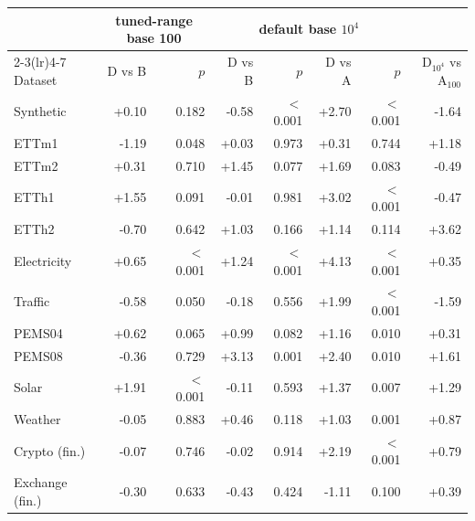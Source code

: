 \begin{tabular}{lrrrrrrr}
\toprule
 & \multicolumn{2}{c}{tuned-range base 100} & \multicolumn{4}{c}{default base $10^4$} & \\
\cmidrule(lr){2-3}\cmidrule(lr){4-7}
Dataset & D vs B & $p$ & D vs B & $p$ & D vs A & $p$ & D$_{10^4}$ vs A$_{100}$ \\
\midrule
Synthetic & +0.10 & 0.182 & -0.58 & $<$0.001 & +2.70 & $<$0.001 & -1.64 \\
ETTm1 & -1.19 & 0.048 & +0.03 & 0.973 & +0.31 & 0.744 & +1.18 \\
ETTm2 & +0.31 & 0.710 & +1.45 & 0.077 & +1.69 & 0.083 & -0.49 \\
ETTh1 & +1.55 & 0.091 & -0.01 & 0.981 & +3.02 & $<$0.001 & -0.47 \\
ETTh2 & -0.70 & 0.642 & +1.03 & 0.166 & +1.14 & 0.114 & +3.62 \\
Electricity & +0.65 & $<$0.001 & +1.24 & $<$0.001 & +4.13 & $<$0.001 & +0.35 \\
Traffic & -0.58 & 0.050 & -0.18 & 0.556 & +1.99 & $<$0.001 & -1.59 \\
PEMS04 & +0.62 & 0.065 & +0.99 & 0.082 & +1.16 & 0.010 & +0.31 \\
PEMS08 & -0.36 & 0.729 & +3.13 & 0.001 & +2.40 & 0.010 & +1.61 \\
Solar & +1.91 & $<$0.001 & -0.11 & 0.593 & +1.37 & 0.007 & +1.29 \\
Weather & -0.05 & 0.883 & +0.46 & 0.118 & +1.03 & 0.001 & +0.87 \\
Crypto (fin.) & -0.07 & 0.746 & -0.02 & 0.914 & +2.19 & $<$0.001 & +0.79 \\
Exchange (fin.) & -0.30 & 0.633 & -0.43 & 0.424 & -1.11 & 0.100 & +0.39 \\
\bottomrule
\end{tabular}
